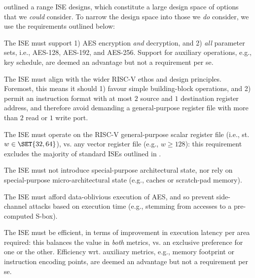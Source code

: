 
outlined a range ISE designs, which constitute a large design space of
options that we {\em could} consider.  To narrow the design space into
those we {\em do} consider, we use the requirements outlined below:

\begin{requirement}\label{req:1}
The ISE must support
1) AES encryption {\em and} decryption,
   and
2) {\em all} parameter sets, i.e., AES-128, AES-192, and AES-256.
Support for 
auxiliary operations, e.g., key schedule, 
are deemed an advantage but not a requirement per se.
\end{requirement}

\begin{requirement}\label{req:2}
The ISE must align with the wider RISC-V ethos and design principles.
Foremost, this means it should 
1) favour simple building-block operations,
   and
2) permit an instruction format with at most $2$ source and $1$ destination register address,
   and therefore avoid demanding a general-purpose register file with more than $2$ read or
   $1$ write port.
\end{requirement}

\begin{requirement}\label{req:3}
The ISE must operate on 
the RISC-V general-purpose scalar register file 
(i.e., st. $w \in \SET{ 32, 64 }$),
vs. 
any                        vector register file
(e.g., $w \ge 128$):
this requirement excludes the majority of standard ISEs outlined in 
.
\end{requirement}

\begin{requirement}\label{req:4}
The ISE must not introduce
special-purpose       architectural state, 
nor rely on
special-purpose micro-architectural state
(e.g., caches or scratch-pad memory).
\end{requirement}

\begin{requirement}\label{req:5}
The ISE must afford data-oblivious execution of AES, and so prevent 
side-channel attacks based on execution time 
(e.g., stemming from accesses to a pre-computed S-box).
\end{requirement}

\begin{requirement}
The ISE must be efficient, in terms of improvement in execution latency 
per area required: this balances the value in {\em both} metrics, vs. an 
exclusive preference for one or the other.
Efficiency wrt. 
auxiliary metrics, e.g., memory footprint or instruction encoding points,
are deemed an advantage but not a requirement per se.
\end{requirement}

